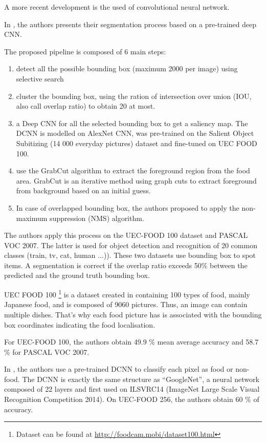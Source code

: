 
A more recent development is the used of convolutional neural network.

In \cite{Shimoda2015}, the authors presents their segmentation process based on a pre-trained deep CNN.

The proposed pipeline is composed of 6 main steps:
\begin{enumerate}
    \item detect all the possible bounding box (maximum 2000 per image) using selective search
    \item cluster the bounding box, using the ration of intersection over union (IOU, also call overlap ratio) to obtain 20 at most.
    \item a Deep CNN for all the selected bounding box to get a saliency map. The DCNN is modelled on AlexNet CNN, was pre-trained on the Salient Object Subitizing (14 000 everyday pictures) dataset and fine-tuned on UEC FOOD 100.
    \item use the GrabCut algorithm to extract the foreground region from the food area. GrabCut is an iterative method using graph cuts to extract foreground from background based on an initial guess.
    \item In case of overlapped bounding box, the authors proposed to apply the non-maximum suppression (NMS) algorithm.
\end{enumerate}

The authors apply this process on the UEC-FOOD 100 dataset and PASCAL VOC 2007. The latter is used for object detection and recognition of 20 common classes (train, tv, cat, human ...)). These two datasets use bounding box to spot items. A segmentation is correct if the overlap ratio exceeds 50\% between the predicted and the ground truth bounding box.

UEC FOOD 100 \footnote{Dataset can be found at \url{http://foodcam.mobi/dataset100.html}} is a dataset created in \cite{Matsuda2012a} containing 100 types of food, mainly Japanese food, and is composed of 9060 pictures. Thus, an image can contain multiple dishes. That's why each food picture has is associated with the bounding box coordinates indicating the food localisation.

For UEC-FOOD 100, the authors obtain 49.9 \% mean average accuracy and 58.7 \% for PASCAL VOC 2007.

In \cite{Bolanos2016}, the authors use a pre-trained DCNN to classify each pixel as food or non-food. The DCNN is exactly the same structure as \enquote{GoogleNet}, a neural network composed of 22 layers and first used on ILSVRC14 (ImageNet Large Scale Visual Recognition Competition 2014). On UEC-FOOD 256, the authors obtain 60 \% of accuracy.

